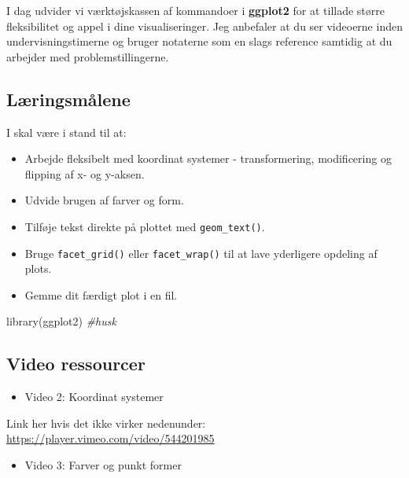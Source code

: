 \documentclass[
]{book}
\newenvironment{Shaded}{\begin{snugshade}}{\end{snugshade}}
\newcommand{\CommentTok}[1]{\textcolor[rgb]{0.56,0.35,0.01}{\textit{#1}}}
\newcommand{\FunctionTok}[1]{\textcolor[rgb]{0.00,0.00,0.00}{#1}}
\newcommand{\NormalTok}[1]{#1}
\providecommand{\tightlist}{%
  \setlength{\itemsep}{0pt}\setlength{\parskip}{0pt}}
\begin{document}
I dag udvider vi værktøjskassen af kommandoer i \textbf{ggplot2} for at tillade større fleksibilitet og appel i dine visualiseringer. Jeg anbefaler at du ser videoerne inden undervisningstimerne og bruger notaterne som en slags reference samtidig at du arbejder med problemstillingerne.

\hypertarget{luxe6ringsmuxe5lene}{%
\subsection{Læringsmålene}\label{luxe6ringsmuxe5lene}}

I skal være i stand til at:

\begin{itemize}
\tightlist
\item
  Arbejde fleksibelt med koordinat systemer - transformering, modificering og flipping af x- og y-aksen.
\item
  Udvide brugen af farver og form.
\item
  Tilføje tekst direkte på plottet med \texttt{geom\_text()}.
\item
  Bruge \texttt{facet\_grid()} eller \texttt{facet\_wrap()} til at lave yderligere opdeling af plots.
\item
  Gemme dit færdigt plot i en fil.
\end{itemize}

\begin{Shaded}
\begin{Highlighting}[]
\FunctionTok{library}\NormalTok{(ggplot2) }\CommentTok{\#husk}
\end{Highlighting}
\end{Shaded}

\hypertarget{video-ressourcer-1}{%
\subsection{Video ressourcer}\label{video-ressourcer-1}}

\begin{itemize}
\tightlist
\item
  Video 2: Koordinat systemer
\end{itemize}

Link her hvis det ikke virker nedenunder: \url{https://player.vimeo.com/video/544201985}

\begin{itemize}
\tightlist
\item
  Video 3: Farver og punkt former
\end{itemize}
\end{document}
